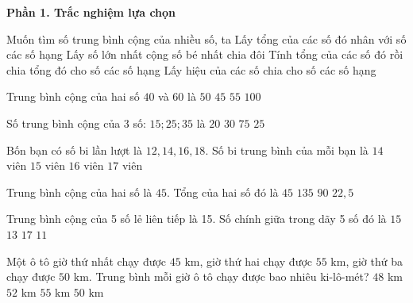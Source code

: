 \textbf{Phần 1. Trắc nghiệm lựa chọn}

\begin{ex} %
Muốn tìm số trung bình cộng của nhiều số, ta
\choice
{Lấy tổng của các số đó nhân với số các số hạng}
{Lấy số lớn nhất cộng số bé nhất chia đôi}
{\True Tính tổng của các số đó rồi chia tổng đó cho số các số hạng}
{Lấy hiệu của các số chia cho số các số hạng}
\end{ex}

\begin{ex} %
Trung bình cộng của hai số $40$ và $60$ là
\choice
{\True $50$}
{$45$}
{$55$}
{$100$}
\end{ex}

\begin{ex} %
Số trung bình cộng của 3 số: $15; 25; 35$ là
\choice
{$20$}
{$30$}
{$75$}
{\True $25$}
\end{ex}

\begin{ex} %
Bốn bạn có số bi lần lượt là $12, 14, 16, 18$. Số bi trung bình của mỗi bạn là
\choice
{$14$ viên}
{\True $15$ viên}
{$16$ viên}
{$17$ viên}
\end{ex}

\begin{ex} %
Trung bình cộng của hai số là $45$. Tổng của hai số đó là
\choice
{$45$}
{$135$}
{\True $90$}
{$22{,}5$}
\end{ex}

\begin{ex} %
Trung bình cộng của 5 số lẻ liên tiếp là 15. Số chính giữa trong dãy 5 số đó là
\choice
{\True $15$}
{$13$}
{$17$}
{$11$}
\end{ex}

\begin{ex} %
Một ô tô giờ thứ nhất chạy được $45\text{ km}$, giờ thứ hai chạy được $55\text{ km}$, giờ thứ ba chạy được $50\text{ km}$. Trung bình mỗi giờ ô tô chạy được bao nhiêu ki-lô-mét?
\choice
{$48\text{ km}$}
{$52\text{ km}$}
{$55\text{ km}$}
{\True $50\text{ km}$}
\end{ex}

